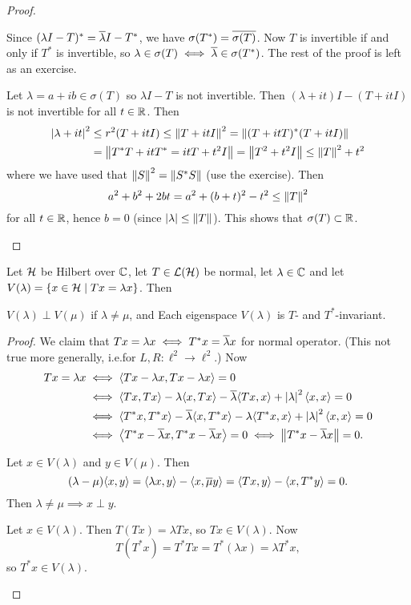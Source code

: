 \begin{proof}
  \lv
  \begin{enum}
    \io
    Since $(\lambda I-T)^* = \overline\lambda I-T^*$, we have $\sigma(T^*) = \overline{\sigma(T)}$.
    Now $T$ is invertible if and only if $T^*$ is invertible, so $\lambda \in \sigma(T) \iff \overline\lambda \in \sigma(T^*)$.
    The rest of the proof is left as an exercise.

    \io
    Let $\lambda = a+ib \in \sigma(T)$ so $\lambda I-T$ is not invertible.
    Then $(\lambda+it)I-(T+itI)$ is not invertible for all $t \in \mathbb{R}$.
    Then
    \begin{align*}
      \left\lvert \lambda+it \right\rvert^2 &\leq r^2(T+itI) \leq \left\lVert T+itI \right\rVert^2 = \left\lVert (T+itT)^*(T+itI) \right\rVert \\
      &= \left\lVert T^*T+itT^*=itT+t^2I \right\rVert = \left\lVert T^2+t^2I \right\rVert \leq \left\lVert T \right\rVert^2 + t^2
    \end{align*}
    where we have used that $\left\lVert S \right\rVert^2=\left\lVert S^*S \right\rVert$ (use the exercise).
    Then
    \[ a^2 + b^2 + 2bt = a^2 + (b+t)^2 - t^2 \leq \left\lVert T \right\rVert^2 \]
    for all $t \in \mathbb{R}$, hence $b=0$ (since $\left\lvert \lambda \right\rvert \leq \left\lVert T \right\rVert$).
    This shows that $\sigma(T) \subset \mathbb{R}$.
  \end{enum}
\end{proof}

\begin{lem}
  Let $\mathcal{H}$ be Hilbert over $\mathbb{C}$, let $T \in \mathcal{L}(\mathcal{H})$ be normal, let $\lambda \in \mathbb{C}$ and let $V(\lambda) = \{ x \in \mathcal{H} \mid Tx = \lambda x \}$.
  Then
  \begin{enum}
    \io $V(\lambda) \perp V(\mu)$ if $\lambda \neq \mu$, and
    \io Each eigenspace $V(\lambda)$ is $T$- and $T^*$-invariant.
  \end{enum}
\end{lem}

\begin{proof}
  We claim that $Tx=\lambda x \iff T^*x=\overline\lambda x$ for normal operator.
  (This not true more generally, i.e.\@ for $L, R: \ell^2 \to \ell^2$.)
  Now
  \begin{align*}
    Tx=\lambda x &\iff {\left\langle Tx-\lambda x,Tx-\lambda x \right\rangle} = 0 \\
    &\iff {\left\langle Tx,Tx \right\rangle} - \lambda{\left\langle x,Tx \right\rangle} - \overline\lambda{\left\langle Tx,x \right\rangle} + \left\lvert \lambda \right\rvert^2{\left\langle x,x \right\rangle} = 0 \\
    &\iff {\left\langle T^*x,T^*x \right\rangle} - \overline\lambda{\left\langle x,T^*x \right\rangle} - \lambda{\left\langle T^*x,x \right\rangle} + \left\lvert \lambda \right\rvert^2{\left\langle x,x \right\rangle} = 0 \\
    &\iff {\left\langle T^*x-\overline\lambda x,T^*x-\overline\lambda x \right\rangle} = 0 \iff \left\lVert T^*x-\overline\lambda x \right\rVert=0.
  \end{align*}
  \begin{enum}
    \io
    Let $x \in V(\lambda)$ and $y \in V(\mu)$.
    Then
    \[ (\lambda-\mu){\left\langle x,y \right\rangle} = {\left\langle \lambda x,y \right\rangle}-{\left\langle x,\overline\mu y \right\rangle} = {\left\langle Tx,y \right\rangle} - {\left\langle x,T^*y \right\rangle} = 0. \]
    Then $\lambda\neq\mu \implies x \perp y$.

    \io
    Let $x \in V(\lambda)$.
    Then $T(Tx)=\lambda Tx$, so $Tx \in V(\lambda)$.
    Now
    \[ T(T^*x) = T^*Tx = T^*(\lambda x) = \lambda T^*x, \]
    so $T^*x \in V(\lambda)$.
  \end{enum}
\end{proof}

